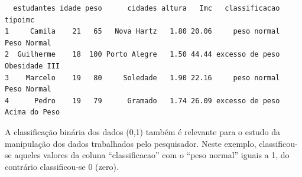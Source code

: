 \documentclass[12pt,portuguese,oneside]{book}
\newenvironment{Shaded}{\begin{snugshade}}{\end{snugshade}}
\newcommand{\KeywordTok}[1]{\textcolor[rgb]{0.13,0.29,0.53}{\textbf{#1}}}
\newcommand{\DecValTok}[1]{\textcolor[rgb]{0.00,0.00,0.81}{#1}}
\newcommand{\FloatTok}[1]{\textcolor[rgb]{0.00,0.00,0.81}{#1}}
\newcommand{\StringTok}[1]{\textcolor[rgb]{0.31,0.60,0.02}{#1}}
\newcommand{\OperatorTok}[1]{\textcolor[rgb]{0.81,0.36,0.00}{\textbf{#1}}}
\newcommand{\NormalTok}[1]{#1}
\begin{document}
\begin{Shaded}
\end{Shaded}

\begin{verbatim}
  estudantes idade peso      cidades altura   Imc   classificacao       tipoimc
1     Camila    21   65   Nova Hartz   1.80 20.06     peso normal   Peso Normal
2  Guilherme    18  100 Porto Alegre   1.50 44.44 excesso de peso Obesidade III
3    Marcelo    19   80     Soledade   1.90 22.16     peso normal   Peso Normal
4      Pedro    19   79      Gramado   1.74 26.09 excesso de peso Acima do Peso
\end{verbatim}

A classificação binária dos dados (0,1) também é relevante para o estudo
da manipulação dos dados trabalhados pelo pesquisador. Neste exemplo,
classificou-se aqueles valores da coluna ``classificacao'' com o ``peso
normal'' iguais a 1, do contrário classificou-se 0 (zero).
\end{document}
